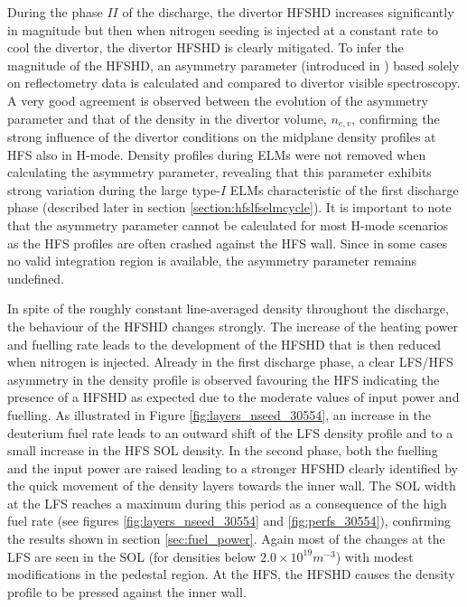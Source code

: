 \documentclass[12pt]{iopart}
\begin{document}
During the phase $II$ of the discharge, the divertor HFSHD increases significantly in magnitude but then when nitrogen seeding is injected at a constant rate to cool the divertor, the divertor HFSHD is clearly mitigated. To infer the magnitude of the HFSHD, an asymmetry parameter (introduced in \cite{guimarais2017poloidal}) based solely on reflectometry data is calculated and compared to divertor visible spectroscopy. A very good agreement is observed between the evolution of the asymmetry parameter and that of the density in the divertor volume, $n_{e,v}$, confirming the strong influence of the divertor conditions on the midplane density profiles at HFS also in H-mode. Density profiles during ELMs were not removed when calculating the asymmetry parameter, revealing that this parameter exhibits strong variation during the large type-$I$ ELMs characteristic of the first discharge phase (described later in section \ref{section:hfslfselmcycle}). It is important to note that the asymmetry parameter cannot be calculated for most H-mode scenarios as the HFS profiles are often crashed against the HFS wall. Since in some cases no valid integration region is available, the asymmetry parameter remains undefined.

In spite of the roughly constant line-averaged density throughout the discharge, the behaviour of the HFSHD changes strongly. The increase of the heating power and fuelling rate leads to the development of the HFSHD that is then reduced when nitrogen is injected. Already in the first discharge phase, a clear LFS/HFS asymmetry in the density profile is observed favouring the HFS indicating the presence of a HFSHD as expected due to the moderate values of input power and fuelling. As illustrated in Figure \ref{fig:layers_nseed_30554}, an increase in the deuterium fuel rate leads to an outward shift of the LFS density profile and to a small increase in the HFS SOL density. In the second phase, both the fuelling and the input power are raised leading to a stronger HFSHD clearly identified by the quick movement of the density layers towards the inner wall. The SOL width at the LFS reaches a maximum during this period as a consequence of the high fuel rate (see figures \ref{fig:layers_nseed_30554} and \ref{fig:perfs_30554}), confirming the results shown in section \ref{sec:fuel_power}. Again most of the changes at the LFS are seen in the SOL (for densities below $2.0\times10^{19}m^{-3}$) with modest modifications in the pedestal region. At the HFS, the HFSHD causes the density profile to be pressed against the inner wall. 
\end{document}
